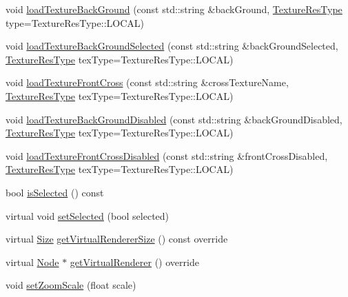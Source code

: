 \begin{DoxyCompactItemize}
\item 
void \hyperlink{classui_1_1AbstractCheckButton_a881269a03ef3da6feeb95a97369c1e37}{load\+Texture\+Back\+Ground} (const std\+::string \&back\+Ground, \hyperlink{classui_1_1Widget_a040a65ec5ad3b11119b7e16b98bd9af0}{Texture\+Res\+Type} type=Texture\+Res\+Type\+::\+L\+O\+C\+AL)
\item 
void \hyperlink{classui_1_1AbstractCheckButton_a060437afe2b6064928901d4839b2c5dc}{load\+Texture\+Back\+Ground\+Selected} (const std\+::string \&back\+Ground\+Selected, \hyperlink{classui_1_1Widget_a040a65ec5ad3b11119b7e16b98bd9af0}{Texture\+Res\+Type} tex\+Type=Texture\+Res\+Type\+::\+L\+O\+C\+AL)
\item 
void \hyperlink{classui_1_1AbstractCheckButton_a8a94e8e135a5e8d1d0be187d77970323}{load\+Texture\+Front\+Cross} (const std\+::string \&cross\+Texture\+Name, \hyperlink{classui_1_1Widget_a040a65ec5ad3b11119b7e16b98bd9af0}{Texture\+Res\+Type} tex\+Type=Texture\+Res\+Type\+::\+L\+O\+C\+AL)
\item 
void \hyperlink{classui_1_1AbstractCheckButton_a6571d84aee7a30b97be6488dd08b6690}{load\+Texture\+Back\+Ground\+Disabled} (const std\+::string \&back\+Ground\+Disabled, \hyperlink{classui_1_1Widget_a040a65ec5ad3b11119b7e16b98bd9af0}{Texture\+Res\+Type} tex\+Type=Texture\+Res\+Type\+::\+L\+O\+C\+AL)
\item 
void \hyperlink{classui_1_1AbstractCheckButton_a6434adf3966aa318552301fbdd32e6b2}{load\+Texture\+Front\+Cross\+Disabled} (const std\+::string \&front\+Cross\+Disabled, \hyperlink{classui_1_1Widget_a040a65ec5ad3b11119b7e16b98bd9af0}{Texture\+Res\+Type} tex\+Type=Texture\+Res\+Type\+::\+L\+O\+C\+AL)
\item 
bool \hyperlink{classui_1_1AbstractCheckButton_ade8bb264515600c46a81947344f4a53b}{is\+Selected} () const
\item 
virtual void \hyperlink{classui_1_1AbstractCheckButton_a9ead27b2e3af75fdf9920134513683c4}{set\+Selected} (bool selected)
\item 
virtual \hyperlink{classSize}{Size} \hyperlink{classui_1_1AbstractCheckButton_a0c3cf028ae6915ee7eb59e287984b0ae}{get\+Virtual\+Renderer\+Size} () const override
\item 
virtual \hyperlink{classNode}{Node} $\ast$ \hyperlink{classui_1_1AbstractCheckButton_a4affc93c2631571aebcc499ddc2f0f62}{get\+Virtual\+Renderer} () override
\item 
void \hyperlink{classui_1_1AbstractCheckButton_ab6a9572b00f989f020ec3002af92f904}{set\+Zoom\+Scale} (float scale)
\item 

\end{DoxyCompactItemize}
